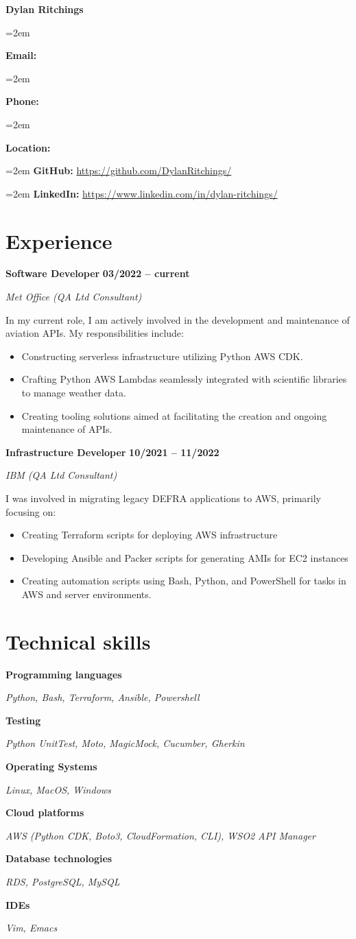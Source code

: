\documentclass[12pt]{article}
\newlength{\spacebox}
\newcommand{\sepspace}{\vspace*{1em}}
\newcommand{\name}[1]{
\Huge 
\begin{center} \textbf{#1} \end{center}\par
\normalsize}
\newcommand{\info}[2]{
  \noindent\hangindent=2em\hangafter=0
  \parbox{\spacebox}{
    \textbf{#1:}} #2 \par
  }
\newcommand{\link}[2]{
  \noindent\hangindent=2em\hangafter=0
  \textbf{#1:} \url{#2} \par
  }
\newcommand{\skill}[2]{
\noindent\hangafter=0
\begin{minipage}[t]{0.31\textwidth}
  \textbf{#1} 
  \end{minipage}
  \hfill 
  \begin{minipage}[t]{0.6\textwidth}
      #2
  \end{minipage}
  \par
  \vspace*{0.5em}} %
\newcommand{\work}[4]{
  \noindent  \textbf{#1}
  \hfill 
  {
  \centering\textbf{#2}} \par
  \noindent \textit{#3} \par
  \vspace*{0.3em}
  \noindent\hangafter=0 \small #4 
\normalsize \par}
\begin{document}
\name{Dylan Ritchings}
\vspace*{-10pt}

\sepspace
\info{Email}{}
\info{Phone}{}
\info{Location}{}

\sepspace
\link{GitHub}{https://github.com/DylanRitchings/}
\link{LinkedIn}{https://www.linkedin.com/in/dylan-ritchings/}

\section*{Experience}

\work{Software Developer}{03/2022 -- current}{Met Office (QA Ltd Consultant)}
{In my current role, I am actively involved in the development and maintenance of aviation APIs. My responsibilities include:

\begin{itemize}
  \item Constructing serverless infrastructure utilizing Python AWS CDK.
  \item Crafting Python AWS Lambdas seamlessly integrated with scientific libraries to manage weather data.
  \item Creating tooling solutions aimed at facilitating the creation and ongoing maintenance of APIs.
\end{itemize}}

\sepspace

\work{Infrastructure Developer}{10/2021 -- 11/2022}{IBM (QA Ltd Consultant)}
{I was involved in migrating legacy DEFRA applications to AWS, primarily focusing on:
\begin{itemize}
    \item Creating Terraform scripts for deploying AWS infrastructure
    \item Developing Ansible and Packer scripts for generating AMIs for EC2 instances
    \item Creating automation scripts using Bash, Python, and PowerShell for tasks in AWS and server environments.
\end{itemize}}

\section*{Technical skills}

\skill{Programming languages}{\textsl{Python, Bash, Terraform, Ansible, Powershell}}
\skill{Testing}{\textsl {Python UnitTest, Moto, MagicMock, Cucumber, Gherkin}}
\skill{Operating Systems}{\textsl{Linux, MacOS, Windows}}
\skill{Cloud platforms}{\textsl{AWS (Python CDK, Boto3, CloudFormation, CLI), WSO2 API Manager}}
\skill{Database technologies}{\textsl{RDS, PostgreSQL, MySQL}}
\skill{IDEs}{\textsl{Vim, Emacs}}
\end{document}
